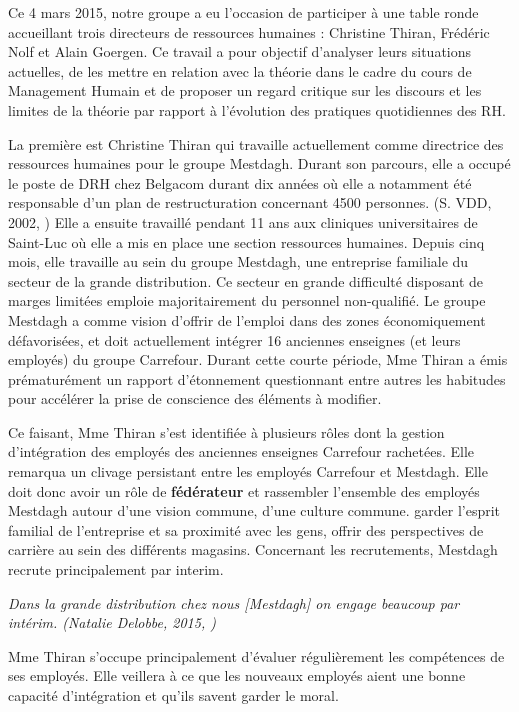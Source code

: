 Ce 4 mars 2015, notre groupe a eu l'occasion de participer à une table ronde accueillant trois directeurs de ressources humaines : Christine Thiran, Frédéric Nolf et Alain Goergen. Ce travail a pour objectif d'analyser leurs situations actuelles, de les mettre en relation avec la théorie dans le cadre du cours de Management Humain et de proposer un regard critique sur les discours et les limites de la théorie par rapport à l'évolution des pratiques quotidiennes des RH. \newline

La première est Christine Thiran qui travaille actuellement comme directrice des ressources humaines pour le groupe Mestdagh. Durant son parcours, elle a occupé le poste de DRH chez Belgacom durant dix années où elle a notamment été responsable d'un plan de restructuration concernant 4500 personnes. (S. VDD, 2002, \cite{planBEST})
Elle a ensuite travaillé pendant 11 ans aux cliniques universitaires de Saint-Luc où elle a mis en place une section ressources humaines.
Depuis cinq mois, elle travaille au sein du groupe Mestdagh, une entreprise familiale du secteur de la grande distribution. Ce secteur en grande difficulté disposant de marges limitées emploie majoritairement du personnel non-qualifié. Le groupe Mestdagh a comme vision d'offrir de l'emploi dans des zones économiquement défavorisées, et doit actuellement intégrer 16 anciennes enseignes (et leurs employés) du groupe Carrefour.
Durant cette courte période, Mme Thiran a émis prématurément un rapport d'étonnement questionnant entre autres les habitudes pour accélérer la prise de conscience des éléments à modifier. \newline

Ce faisant, Mme Thiran s'est identifiée à plusieurs rôles dont la gestion d'intégration des employés des anciennes enseignes Carrefour rachetées. Elle remarqua un clivage persistant entre les employés Carrefour et Mestdagh. Elle doit donc avoir un rôle de \textbf{fédérateur} et rassembler l'ensemble des employés Mestdagh autour d'une vision commune, d'une culture commune.  garder l'esprit familial de l'entreprise et sa proximité avec les gens, offrir des perspectives de carrière au sein des différents magasins. Concernant les recrutements, Mestdagh recrute principalement par interim.
\begin{center}
\textit{\og{}Dans la grande distribution chez nous [Mestdagh] on engage beaucoup par intérim.\fg{} (Natalie Delobbe, 2015, \cite{tableronde})}	
\end{center}
Mme Thiran s'occupe principalement d'évaluer régulièrement les compétences de ses employés. Elle veillera à ce que les nouveaux employés aient une bonne capacité d'intégration et qu'ils savent garder le moral.  %

